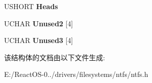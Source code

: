 \begin{DoxyCompactItemize}
U\+S\+H\+O\+RT {\bfseries Heads}
\item 
\mbox{\label{struct___b_i_o_s___p_a_r_a_m_e_t_e_r_s___b_l_o_c_k_af5d078bb8fd977ac4bf61bc9ec1702fc}} 
U\+C\+H\+AR {\bfseries Unused2} \mbox{[}4\mbox{]}
\item 
\mbox{\label{struct___b_i_o_s___p_a_r_a_m_e_t_e_r_s___b_l_o_c_k_a7d7ae2f560d899f4689d39c26f3f02bf}} 
U\+C\+H\+AR {\bfseries Unused3} \mbox{[}4\mbox{]}
\end{DoxyCompactItemize}


该结构体的文档由以下文件生成\+:\begin{DoxyCompactItemize}
\item 
E\+:/\+React\+O\+S-\/0../drivers/filesystems/ntfs/ntfs.\+h\end{DoxyCompactItemize}
